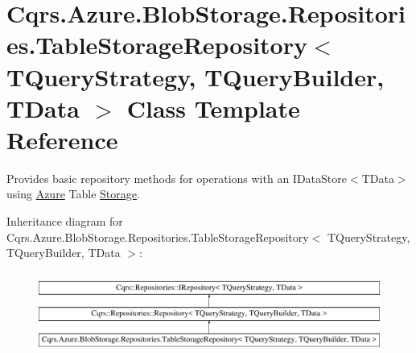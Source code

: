 \hypertarget{classCqrs_1_1Azure_1_1BlobStorage_1_1Repositories_1_1TableStorageRepository}{}\section{Cqrs.\+Azure.\+Blob\+Storage.\+Repositories.\+Table\+Storage\+Repository$<$ T\+Query\+Strategy, T\+Query\+Builder, T\+Data $>$ Class Template Reference}
\label{classCqrs_1_1Azure_1_1BlobStorage_1_1Repositories_1_1TableStorageRepository}


Provides basic repository methods for operations with an I\+Data\+Store$<$\+T\+Data$>$ using \hyperlink{namespaceCqrs_1_1Azure}{Azure} Table \hyperlink{namespaceCqrs_1_1Azure_1_1Storage}{Storage}.  


Inheritance diagram for Cqrs.\+Azure.\+Blob\+Storage.\+Repositories.\+Table\+Storage\+Repository$<$ T\+Query\+Strategy, T\+Query\+Builder, T\+Data $>$\+:\begin{figure}[H]
\begin{center}
\leavevmode
\includegraphics[height=2.722852cm]{classCqrs_1_1Azure_1_1BlobStorage_1_1Repositories_1_1TableStorageRepository}
\end{center}
\end{figure}
